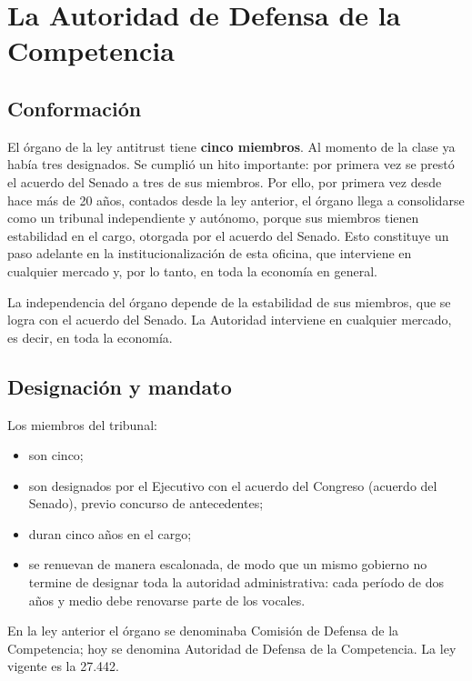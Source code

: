 \documentclass[12pt,oneside]{book}
\begin{document}
\section{La Autoridad de Defensa de la Competencia}

\subsection{Conformación}

El órgano de la ley antitrust tiene \textbf{cinco miembros}. Al momento de la clase ya había tres designados. Se cumplió un hito importante: por primera vez se prestó el acuerdo del Senado a tres de sus miembros. Por ello, por primera vez desde hace más de 20 años, contados desde la ley anterior, el órgano llega a consolidarse como un tribunal independiente y autónomo, porque sus miembros tienen estabilidad en el cargo, otorgada por el acuerdo del Senado. Esto constituye un paso adelante en la institucionalización de esta oficina, que interviene en cualquier mercado y, por lo tanto, en toda la economía en general.

\begin{important}
La independencia del órgano depende de la estabilidad de sus miembros, que se logra con el acuerdo del Senado. La Autoridad interviene en cualquier mercado, es decir, en toda la economía.
\end{important}

\subsection{Designación y mandato}

Los miembros del tribunal:
\begin{itemize}
    \item son cinco;
    \item son designados por el Ejecutivo con el acuerdo del Congreso (acuerdo del Senado), previo concurso de antecedentes;
    \item duran cinco años en el cargo;
    \item se renuevan de manera escalonada, de modo que un mismo gobierno no termine de designar toda la autoridad administrativa: cada período de dos años y medio debe renovarse parte de los vocales.
\end{itemize}

En la ley anterior el órgano se denominaba Comisión de Defensa de la Competencia; hoy se denomina Autoridad de Defensa de la Competencia. La ley vigente es la 27.442.
\end{document}
